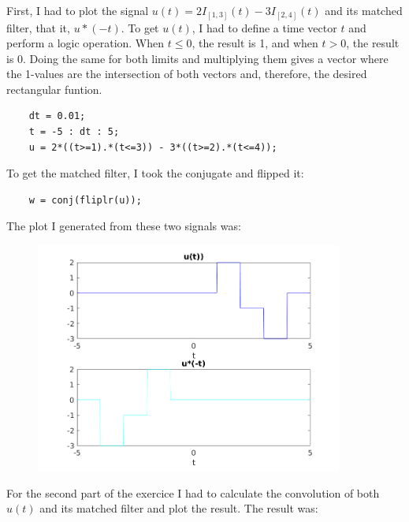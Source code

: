 \documentclass[a4paper,11pt]{article}
\begin{document}
First, I had to plot the signal $u(t) = 2I_{[1,3]}(t) - 3I_{[2,4]}(t)$ and its matched filter, that it, $u*(-t)$. To get $u(t)$, I had to define a time vector $t$ and perform a logic operation. When $t\leq 0$, the result is 1, and when $t > 0$, the result is 0. Doing the same for both limits and multiplying them gives a vector where the 1-values are the intersection of both vectors and, therefore, the desired rectangular funtion.

\bigskip

\begin{lstlisting}
    dt = 0.01;
    t = -5 : dt : 5;
    u = 2*((t>=1).*(t<=3)) - 3*((t>=2).*(t<=4));
\end{lstlisting}

\bigskip

To get the matched filter, I took the conjugate and flipped it:

\bigskip

\begin{lstlisting}
    w = conj(fliplr(u));
\end{lstlisting}

\bigskip

The plot I generated from these two signals was:

\begin{figure}[!hp]
    \begin{center}
      \includegraphics[width=0.9\textwidth]{images/exercice_3a.png}
    \end{center}
\end{figure}

\newpage

For the second part of the exercice I had to calculate the convolution of both $u(t)$ and its matched filter and plot the result. The result was:
\end{document}

